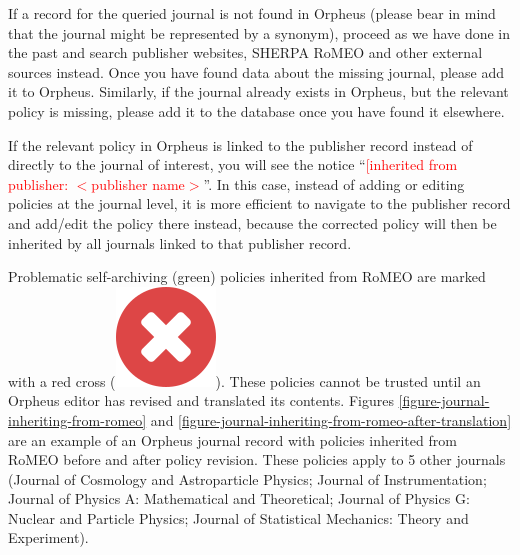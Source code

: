 \documentclass[british, 12pt]{article}
\begin{document}
If a record for the queried journal is not found in Orpheus (please bear in mind that the journal might be represented by a synonym), proceed as we have done in the past and search publisher websites, SHERPA RoMEO and other external sources instead. Once you have found data about the missing journal, please add it to Orpheus. Similarly, if the journal already exists in Orpheus, but the relevant policy is missing, please add it to the database once you have found it elsewhere.

If the relevant policy in Orpheus is linked to the publisher record instead of directly to the journal of interest, you will see the notice ``\textcolor{red}{[inherited from publisher: $<$publisher name$>$}''. In this case, instead of adding or editing policies at the journal level, it is more efficient to navigate to the publisher record and add/edit the policy there instead, because the corrected policy will then be inherited by all journals linked to that publisher record.

Problematic self-archiving (green) policies inherited from RoMEO are marked with a red cross (\includegraphics{icon-no}). These policies cannot be trusted until an Orpheus editor has revised and translated its contents. Figures \vref{figure-journal-inheriting-from-romeo} and \vref{figure-journal-inheriting-from-romeo-after-translation} are an example of an Orpheus journal record with policies inherited from RoMEO before and after policy revision. These policies apply to 5 other journals (Journal of Cosmology and Astroparticle Physics;  Journal of Instrumentation;  Journal of Physics A: Mathematical and Theoretical;  Journal of Physics G: Nuclear and Particle Physics;  Journal of Statistical Mechanics: Theory and Experiment).
\end{document}
